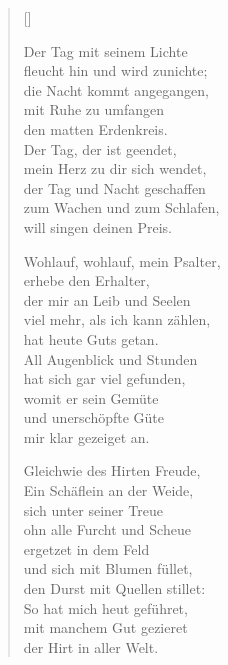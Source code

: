 \begin{multicols}{2}
\settowidth{\versewidth}{Wohlauf, wohlauf, mein Psalter,}
\begin{verse}[\versewidth]

 Der Tag mit seinem Lichte\\
fleucht hin und wird zunichte;\\
die Nacht kommt angegangen,\\
mit Ruhe zu umfangen\\
den matten Erdenkreis.\\
Der Tag, der ist geendet,\\
mein Herz zu dir sich wendet,\\
der Tag und Nacht geschaffen\\
zum Wachen und zum Schlafen,\\
will singen deinen Preis.

 Wohlauf, wohlauf, mein Psalter,\\
erhebe den Erhalter,\\
der mir an Leib und Seelen\\
viel mehr, als ich kann zählen,\\
hat heute Guts getan.\\
All Augenblick und Stunden\\
hat sich gar viel gefunden,\\
womit er sein Gemüte\\
und unerschöpfte Güte\\
mir klar gezeiget an.

 Gleichwie des Hirten Freude,\\
Ein Schäflein an der Weide,\\
sich unter seiner Treue\\
ohn alle Furcht und Scheue\\
ergetzet in dem Feld\\
und sich mit Blumen füllet,\\
den Durst mit Quellen stillet:\\
So hat mich heut geführet,\\
mit manchem Gut gezieret\\
der Hirt in aller Welt.


\end{verse}
\end{multicols}
